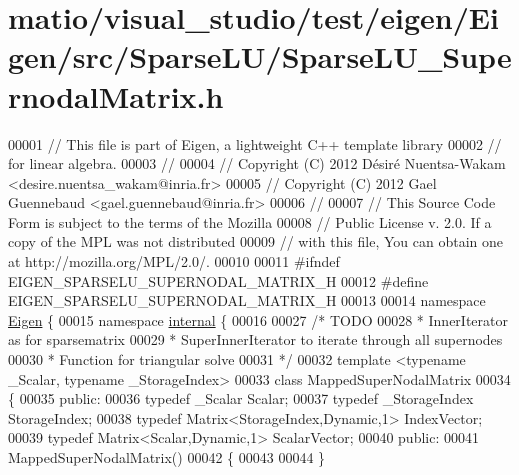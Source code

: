 \hypertarget{matio_2visual__studio_2test_2eigen_2_eigen_2src_2_sparse_l_u_2_sparse_l_u___supernodal_matrix_8h_source}{}\section{matio/visual\+\_\+studio/test/eigen/\+Eigen/src/\+Sparse\+L\+U/\+Sparse\+L\+U\+\_\+\+Supernodal\+Matrix.h}
\label{matio_2visual__studio_2test_2eigen_2_eigen_2src_2_sparse_l_u_2_sparse_l_u___supernodal_matrix_8h_source}

\begin{DoxyCode}
00001 \textcolor{comment}{// This file is part of Eigen, a lightweight C++ template library}
00002 \textcolor{comment}{// for linear algebra.}
00003 \textcolor{comment}{//}
00004 \textcolor{comment}{// Copyright (C) 2012 Désiré Nuentsa-Wakam <desire.nuentsa\_wakam@inria.fr>}
00005 \textcolor{comment}{// Copyright (C) 2012 Gael Guennebaud <gael.guennebaud@inria.fr>}
00006 \textcolor{comment}{//}
00007 \textcolor{comment}{// This Source Code Form is subject to the terms of the Mozilla}
00008 \textcolor{comment}{// Public License v. 2.0. If a copy of the MPL was not distributed}
00009 \textcolor{comment}{// with this file, You can obtain one at http://mozilla.org/MPL/2.0/.}
00010 
00011 \textcolor{preprocessor}{#ifndef EIGEN\_SPARSELU\_SUPERNODAL\_MATRIX\_H}
00012 \textcolor{preprocessor}{#define EIGEN\_SPARSELU\_SUPERNODAL\_MATRIX\_H}
00013 
00014 \textcolor{keyword}{namespace }\hyperlink{namespace_eigen}{Eigen} \{
00015 \textcolor{keyword}{namespace }\hyperlink{namespaceinternal}{internal} \{
00016 
00027 \textcolor{comment}{/* TODO}
00028 \textcolor{comment}{ * InnerIterator as for sparsematrix }
00029 \textcolor{comment}{ * SuperInnerIterator to iterate through all supernodes }
00030 \textcolor{comment}{ * Function for triangular solve}
00031 \textcolor{comment}{ */}
00032 \textcolor{keyword}{template} <\textcolor{keyword}{typename} \_Scalar, \textcolor{keyword}{typename} \_StorageIndex>
00033 \textcolor{keyword}{class }MappedSuperNodalMatrix
00034 \{
00035   \textcolor{keyword}{public}:
00036     \textcolor{keyword}{typedef} \_Scalar Scalar; 
00037     \textcolor{keyword}{typedef} \_StorageIndex StorageIndex;
00038     \textcolor{keyword}{typedef} Matrix<StorageIndex,Dynamic,1> IndexVector;
00039     \textcolor{keyword}{typedef} Matrix<Scalar,Dynamic,1> ScalarVector;
00040   \textcolor{keyword}{public}:
00041     MappedSuperNodalMatrix()
00042     \{
00043       
00044     \}

\end{DoxyCode}
